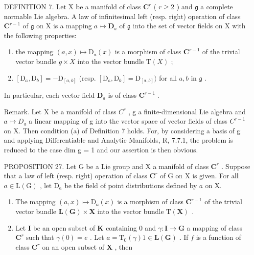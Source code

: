 DEFINITION 7. Let X be a manifold of class \(\mathbf{C}^r\) ( \(r \geqslant 2\) ) and \(\mathfrak{g}\) a complete normable Lie algebra. A law of infinitesimal left (resp. right) operation of class \(\mathbf{C}^{r-1}\) of \(\mathfrak{g}\) on X is a mapping \(a \mapsto \mathbf{D}_a\) of \(\mathfrak{g}\) into the set of vector fields on X with the following properties:

\begin{enumerate}
\def\labelenumi{(\alph{enumi})}
\item
  the mapping \((a, x) \mapsto \mathrm{D}_a(x)\) is a morphism of class \(\mathbf{C}^{r-1}\) of the trivial vector bundle \(g \times X\) into the vector bundle \(\mathrm{T}(X)\) ;
\item
  \([\mathrm{D}_a,\mathrm{D}_b] = -\mathrm{D}_{[a,b]}\) (resp. \([\mathrm{D}_a,\mathrm{D}_b] = \mathrm{D}_{[a,b]})\) for all \(a,b\) in \(\mathfrak{g}\) .
\end{enumerate}

In particular, each vector field \(\mathbf{D}_a\) is of class \(\mathbf{C}^{r - 1}\) .

Remark. Let X be a manifold of class \(C^{r}\) , g a finite-dimensional Lie algebra and \(a \mapsto D_{a}\) a linear mapping of g into the vector space of vector fields of class \(C^{r-1}\) on X. Then condition (a) of Definition 7 holds. For, by considering a basis of g and applying Differentiable and Analytic Manifolds, R, 7.7.1, the problem is reduced to the case dim g = 1 and our assertion is then obvious.

PROPOSITION 27. Let G be a Lie group and X a manifold of class \(\mathbf{C}^r\) . Suppose that a law of left (resp. right) operation of class \(\mathbf{C}^r\) of G on X is given. For all \(a \in \mathrm{L}(\mathrm{G})\) , let \(\mathrm{D}_a\) be the field of point distributions defined by \(a\) on X.

\begin{enumerate}
\def\labelenumi{(\roman{enumi})}
\item
  The mapping \((a, x) \mapsto \mathrm{D}_a(x)\) is a morphism of class \(\mathbf{C}^{r-1}\) of the trivial vector bundle \(\mathbf{L}(\mathbf{G}) \times \mathbf{X}\) into the vector bundle \(\mathrm{T}(\mathbf{X})\) .
\item
  Let \(\mathbf{I}\) be an open subset of \(\mathbf{K}\) containing 0 and \(\gamma: \mathbf{I} \to \mathbf{G}\) a mapping of class \(\mathbf{C}^r\) such that \(\gamma(0) = e\) . Let \(a = \mathrm{T}_0(\gamma) 1 \in \mathbf{L}(\mathbf{G})\) . If \(f\) is a function of class \(\mathbf{C}^r\) on an open subset of \(\mathbf{X}\) , then
\end{enumerate}


